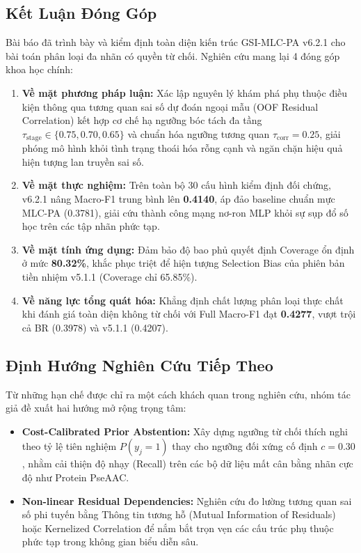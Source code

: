 \documentclass[10pt,a4paper,twoside]{article}
\begin{document}
\subsection{Kết Luận Đóng Góp}
Bài báo đã trình bày và kiểm định toàn diện kiến trúc GSI-MLC-PA v6.2.1 cho bài toán phân loại đa nhãn có quyền từ chối. Nghiên cứu mang lại 4 đóng góp khoa học chính:
\begin{enumerate}[leftmargin=*]
    \item \textbf{Về mặt phương pháp luận:} Xác lập nguyên lý khám phá phụ thuộc điều kiện thông qua tương quan sai số dự đoán ngoại mẫu (OOF Residual Correlation) kết hợp cơ chế hạ ngưỡng bóc tách đa tầng $\tau_{\text{stage}} \in \{0.75, 0.70, 0.65\}$ và chuẩn hóa ngưỡng tương quan $\tau_{\text{corr}} = 0.25$, giải phóng mô hình khỏi tình trạng thoái hóa rỗng cạnh và ngăn chặn hiệu quả hiện tượng lan truyền sai số.
    \item \textbf{Về mặt thực nghiệm:} Trên toàn bộ 30 cấu hình kiểm định đối chứng, v6.2.1 nâng Macro-F1 trung bình lên \textbf{0.4140}, áp đảo baseline chuẩn mực MLC-PA (0.3781), giải cứu thành công mạng nơ-ron MLP khỏi sự sụp đổ số học trên các tập nhãn phức tạp.
    \item \textbf{Về mặt tính ứng dụng:} Đảm bảo độ bao phủ quyết định Coverage ổn định ở mức \textbf{80.32\%}, khắc phục triệt để hiện tượng Selection Bias của phiên bản tiền nhiệm v5.1.1 (Coverage chỉ 65.85\%).
    \item \textbf{Về năng lực tổng quát hóa:} Khẳng định chất lượng phân loại thực chất khi đánh giá toàn diện không từ chối với Full Macro-F1 đạt \textbf{0.4277}, vượt trội cả BR (0.3978) và v5.1.1 (0.4207).
\end{enumerate}

\subsection{Định Hướng Nghiên Cứu Tiếp Theo}
Từ những hạn chế được chỉ ra một cách khách quan trong nghiên cứu, nhóm tác giả đề xuất hai hướng mở rộng trọng tâm:
\begin{itemize}[leftmargin=*]
    \item \textbf{Cost-Calibrated Prior Abstention:} Xây dựng ngưỡng từ chối thích nghi theo tỷ lệ tiên nghiệm $P(y_j = 1)$ thay cho ngưỡng đối xứng cố định $c = 0.30$, nhằm cải thiện độ nhạy (Recall) trên các bộ dữ liệu mất cân bằng nhãn cực độ như Protein PseAAC.
    \item \textbf{Non-linear Residual Dependencies:} Nghiên cứu đo lường tương quan sai số phi tuyến bằng Thông tin tương hỗ (Mutual Information of Residuals) hoặc Kernelized Correlation để nắm bắt trọn vẹn các cấu trúc phụ thuộc phức tạp trong không gian biểu diễn sâu.
\end{itemize}
\end{document}
